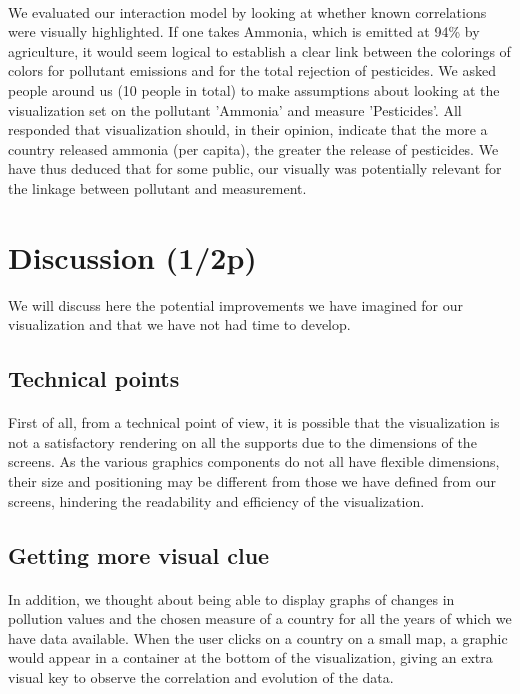 \documentclass[preprint,journal]{vgtc}       %
\begin{document}
\paragraph{}
We evaluated our interaction model by looking at whether known correlations were visually highlighted.
If one takes Ammonia, which is emitted at 94\% by agriculture, it would seem logical to establish a clear link between the colorings of colors for pollutant emissions and for the total rejection of pesticides. We asked people around us (10 people in total) to make assumptions about looking at the visualization set on the pollutant 'Ammonia' and measure 'Pesticides'. All responded that visualization should, in their opinion, indicate that the more a country released ammonia (per capita), the greater the release of pesticides. We have thus deduced that for some public, our visually was potentially relevant for the linkage between pollutant and measurement.

\section{Discussion (1/2p)}

We will discuss here the potential improvements we have imagined for our visualization and that we have not had time to develop. 

\subsection{Technical points}

\paragraph{}
First of all, from a technical point of view, it is possible that the visualization is not a satisfactory rendering on all the supports due to the dimensions of the screens. As the various graphics components do not all have flexible dimensions, their size and positioning may be different from those we have defined from our screens, hindering the readability and efficiency of the visualization. 


\subsection{Getting more visual clue}

\paragraph{}
In addition, we thought about being able to display graphs of changes in pollution values ​​and the chosen measure of a country for all the years of which we have data available. When the user clicks on a country on a small map, a graphic would appear in a container at the bottom of the visualization, giving an extra visual key to observe the correlation and evolution of the data. 
\end{document}
